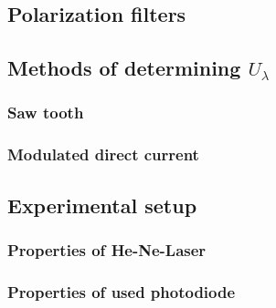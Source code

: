 \subsection{Polarization filters}

\subsection{Methods of determining $U_\lambda$}
\subsubsection{Saw tooth}
\subsubsection{Modulated direct current}

\subsection{Experimental setup}
\subsubsection{Properties of He-Ne-Laser}
\subsubsection{Properties of used photodiode}
